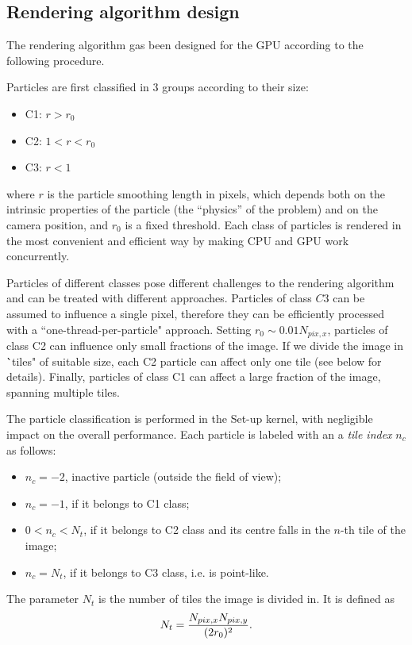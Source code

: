 \documentclass[11pt]{article}
\begin{document}
\subsection{Rendering algorithm design}

The rendering algorithm gas been designed for the GPU according to the following procedure.

Particles are first classified in 3 groups according to their size:
\begin{itemize}
\item 
C1: $r > r_0$
\item
C2: $1 < r < r_0$
\item
C3: $r < 1$
\end{itemize}
where $r$ is the particle smoothing length in pixels, which depends both on the 
intrinsic properties of the particle (the ``physics'' of the problem) 
and on the camera position, and $r_0$ is a fixed threshold. Each class of 
particles is rendered in the most convenient and efficient way by making CPU and GPU 
work concurrently.

Particles of different classes pose different challenges to the rendering 
algorithm and can be treated with different approaches. Particles of class $C3$ 
can be assumed to influence a single pixel, therefore they can be efficiently 
processed with a ``one-thread-per-particle" approach. Setting $r_0 \sim 0.01 N_{pix,x}$, 
particles of class C2 can influence only small fractions of the image. If 
we divide the image in \``tiles" of suitable size, each C2 particle can affect 
only one tile (see below for details). Finally, particles of class C1 can affect 
a large fraction of the image, spanning multiple tiles.

The particle classification is performed in the Set-up kernel, with negligible impact
on the overall performance. Each particle is labeled
with an a {\it tile index} $n_c$ as follows:
\begin{itemize}
\item 
$n_c = -2$, inactive particle (outside the field of view);
\item
$n_c = -1$, if it belongs to C1 class; 
\item
$0 < n_c < N_t$, if it belongs to C2 class and its centre falls in the $n$-th tile of the image;  
\item
$n_c = N_t$, if it belongs to C3 class, i.e. is point-like.
\end{itemize}
The parameter $N_t$ is the number of tiles the image is divided in. It is defined as
\begin{equation}
N_t = {N_{pix,x} N_{pix,y}\over (2r_0)^2}.   
\end{equation}
\end{document}
